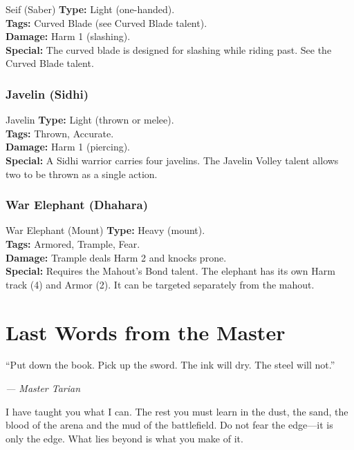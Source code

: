 \documentclass[9pt,a5paper]{extbook}
\begin{document}
\begin{weaponcard}{Seif (Saber)}
\textbf{Type:} Light (one-handed). \\
\textbf{Tags:} Curved Blade (see Curved Blade talent). \\
\textbf{Damage:} Harm 1 (slashing). \\
\textbf{Special:} The curved blade is designed for slashing while riding past. See the Curved Blade talent.
\end{weaponcard}

\subsection{Javelin (Sidhi)}

\begin{weaponcard}{Javelin}
\textbf{Type:} Light (thrown or melee). \\
\textbf{Tags:} Thrown, Accurate. \\
\textbf{Damage:} Harm 1 (piercing). \\
\textbf{Special:} A Sidhi warrior carries four javelins. The Javelin Volley talent allows two to be thrown as a single action.
\end{weaponcard}

\subsection{War Elephant (Dhahara)}

\begin{weaponcard}{War Elephant (Mount)}
\textbf{Type:} Heavy (mount). \\
\textbf{Tags:} Armored, Trample, Fear. \\
\textbf{Damage:} Trample deals Harm 2 and knocks prone. \\
\textbf{Special:} Requires the Mahout's Bond talent. The elephant has its own Harm track (4) and Armor (2). It can be targeted separately from the mahout.
\end{weaponcard}

\clearpage

\chapter{Last Words from the Master}
\epigraph{``Put down the book. Pick up the sword. The ink will dry. The steel will not.''}{\textit{--- Master Tarian}}

I have taught you what I can. The rest you must learn in the dust, the sand, the blood of the arena and the mud of the battlefield. Do not fear the edge---it is only the edge. What lies beyond is what you make of it.
\end{document}

